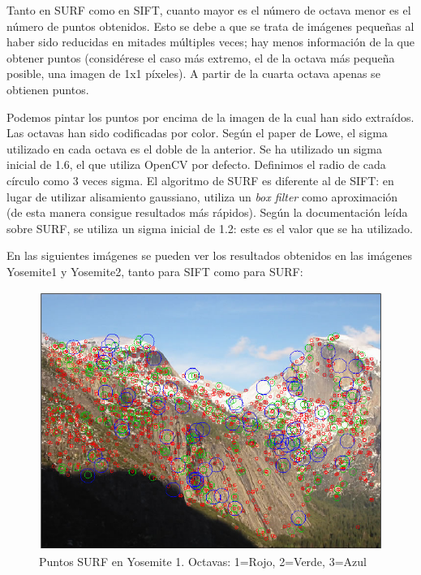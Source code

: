 \documentclass[12pt,spanish]{article} %
\begin{document}
Tanto en SURF como en SIFT, cuanto mayor es el número de octava menor es el número de puntos obtenidos. Esto se debe a que se trata de imágenes pequeñas al haber sido reducidas en mitades múltiples veces; hay menos información de la que obtener puntos (considérese el caso más extremo, el de la octava más pequeña posible, una imagen de 1x1 píxeles). A partir de la cuarta octava apenas se obtienen puntos.

Podemos pintar los puntos por encima de la imagen de la cual han sido extraídos. Las octavas han sido codificadas por color. Según el paper de Lowe, el sigma utilizado en cada octava es el doble de la anterior. Se ha utilizado un sigma inicial de 1.6, el que utiliza OpenCV por defecto. Definimos el radio de cada círculo como 3 veces sigma. El algoritmo de SURF es diferente al de SIFT: en lugar de utilizar alisamiento gaussiano, utiliza un \textit{box filter} como aproximación (de esta manera consigue resultados más rápidos). Según la documentación leída sobre SURF, se utiliza un sigma inicial de 1.2: este es el valor que se ha utilizado.

En las siguientes imágenes se pueden ver los resultados obtenidos en las imágenes Yosemite1 y Yosemite2, tanto para SIFT como para SURF:

\begin{figure}[H]
  \begin{center}
  \includegraphics[scale=.6]{ej1_surf1_octavas}
  \caption{Puntos SURF en Yosemite 1. Octavas: 1=Rojo, 2=Verde, 3=Azul}
  \label{fig:ej1_surf1_octavas}
  \end{center}
\end{figure}
\end{document}
